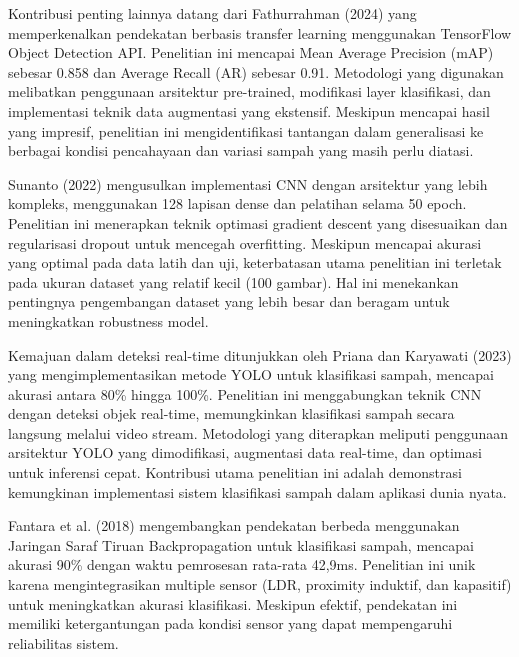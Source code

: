 \documentclass[12pt,a4paper]{article}
\begin{document}
\begin{adjustwidth}{3em}{0pt}
\vspace{1em}
\hspace{0.5cm} Kontribusi penting lainnya datang dari Fathurrahman (2024) yang memperkenalkan pendekatan berbasis transfer learning menggunakan TensorFlow Object Detection API. Penelitian ini mencapai Mean Average Precision (mAP) sebesar 0.858 dan Average Recall (AR) sebesar 0.91. Metodologi yang digunakan melibatkan penggunaan arsitektur pre-trained, modifikasi layer klasifikasi, dan implementasi teknik data augmentasi yang ekstensif. Meskipun mencapai hasil yang impresif, penelitian ini mengidentifikasi tantangan dalam generalisasi ke berbagai kondisi pencahayaan dan variasi sampah yang masih perlu diatasi.

\vspace{1em}
\hspace{0.5cm} Sunanto (2022) mengusulkan implementasi CNN dengan arsitektur yang lebih kompleks, menggunakan 128 lapisan dense dan pelatihan selama 50 epoch. Penelitian ini menerapkan teknik optimasi gradient descent yang disesuaikan dan regularisasi dropout untuk mencegah overfitting. Meskipun mencapai akurasi yang optimal pada data latih dan uji, keterbatasan utama penelitian ini terletak pada ukuran dataset yang relatif kecil (100 gambar). Hal ini menekankan pentingnya pengembangan dataset yang lebih besar dan beragam untuk meningkatkan robustness model.

\vspace{1em}
\hspace{0.5cm} Kemajuan dalam deteksi real-time ditunjukkan oleh Priana dan Karyawati (2023) yang mengimplementasikan metode YOLO untuk klasifikasi sampah, mencapai akurasi antara 80\% hingga 100\%. Penelitian ini menggabungkan teknik CNN dengan deteksi objek real-time, memungkinkan klasifikasi sampah secara langsung melalui video stream. Metodologi yang diterapkan meliputi penggunaan arsitektur YOLO yang dimodifikasi, augmentasi data real-time, dan optimasi untuk inferensi cepat. Kontribusi utama penelitian ini adalah demonstrasi kemungkinan implementasi sistem klasifikasi sampah dalam aplikasi dunia nyata.

\vspace{1em}
\hspace{0.5cm} Fantara et al. (2018) mengembangkan pendekatan berbeda menggunakan Jaringan Saraf Tiruan Backpropagation untuk klasifikasi sampah, mencapai akurasi 90\% dengan waktu pemrosesan rata-rata 42,9ms. Penelitian ini unik karena mengintegrasikan multiple sensor (LDR, proximity induktif, dan kapasitif) untuk meningkatkan akurasi klasifikasi. Meskipun efektif, pendekatan ini memiliki ketergantungan pada kondisi sensor yang dapat mempengaruhi reliabilitas sistem.


\end{adjustwidth}
\end{document}
